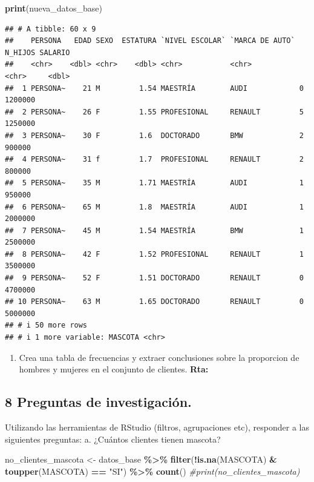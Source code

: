 \documentclass[
]{article}
\newenvironment{Shaded}{\begin{snugshade}}{\end{snugshade}}
\newcommand{\CommentTok}[1]{\textcolor[rgb]{0.56,0.35,0.01}{\textit{#1}}}
\newcommand{\FunctionTok}[1]{\textcolor[rgb]{0.13,0.29,0.53}{\textbf{#1}}}
\newcommand{\NormalTok}[1]{#1}
\newcommand{\OtherTok}[1]{\textcolor[rgb]{0.56,0.35,0.01}{#1}}
\newcommand{\SpecialCharTok}[1]{\textcolor[rgb]{0.81,0.36,0.00}{\textbf{#1}}}
\newcommand{\StringTok}[1]{\textcolor[rgb]{0.31,0.60,0.02}{#1}}
\providecommand{\tightlist}{%
  \setlength{\itemsep}{0pt}\setlength{\parskip}{0pt}}
\begin{document}
\begin{Shaded}
\begin{Highlighting}[]
\FunctionTok{print}\NormalTok{(nueva\_datos\_base)}
\end{Highlighting}
\end{Shaded}

\begin{verbatim}
## # A tibble: 60 x 9
##    PERSONA   EDAD SEXO  ESTATURA `NIVEL ESCOLAR` `MARCA DE AUTO` N_HIJOS SALARIO
##    <chr>    <dbl> <chr>    <dbl> <chr>           <chr>           <chr>     <dbl>
##  1 PERSONA~    21 M         1.54 MAESTRÍA        AUDI            0       1200000
##  2 PERSONA~    26 F         1.55 PROFESIONAL     RENAULT         5       1250000
##  3 PERSONA~    30 F         1.6  DOCTORADO       BMW             2        900000
##  4 PERSONA~    31 f         1.7  PROFESIONAL     RENAULT         2        800000
##  5 PERSONA~    35 M         1.71 MAESTRÍA        AUDI            1        950000
##  6 PERSONA~    65 M         1.8  MAESTRÍA        AUDI            1       2000000
##  7 PERSONA~    45 M         1.54 MAESTRÍA        BMW             1       2500000
##  8 PERSONA~    42 F         1.52 PROFESIONAL     RENAULT         1       3500000
##  9 PERSONA~    52 F         1.51 DOCTORADO       RENAULT         0       4700000
## 10 PERSONA~    63 M         1.65 DOCTORADO       RENAULT         0       5000000
## # i 50 more rows
## # i 1 more variable: MASCOTA <chr>
\end{verbatim}

\begin{enumerate}
\def\labelenumi{\alph{enumi}.}
\setcounter{enumi}{1}
\tightlist
\item
  Crea una tabla de frecuencias y extraer conclusiones sobre la
  proporcion de hombres y mujeres en el conjunto de clientes.
  \textbf{Rta:}
\end{enumerate}

\newpage

\subsection{8 Preguntas de
investigación.}\label{preguntas-de-investigaciuxf3n.}

Utilizando las herramientas de RStudio (filtros, agrupaciones etc),
responder a las siguientes preguntas: a. ¿Cuántos clientes tienen
mascota?

\begin{Shaded}
\begin{Highlighting}[]
\NormalTok{no\_clientes\_mascota }\OtherTok{\textless{}{-}}\NormalTok{ datos\_base }\SpecialCharTok{\%\textgreater{}\%}  
  \FunctionTok{filter}\NormalTok{(}\SpecialCharTok{!}\FunctionTok{is.na}\NormalTok{(MASCOTA) }\SpecialCharTok{\&} \FunctionTok{toupper}\NormalTok{(MASCOTA) }\SpecialCharTok{==} \StringTok{"SI"}\NormalTok{) }\SpecialCharTok{\%\textgreater{}\%} 
  \FunctionTok{count}\NormalTok{()}
\CommentTok{\#print(no\_clientes\_mascota)}
\end{Highlighting}
\end{Shaded}
\end{document}

